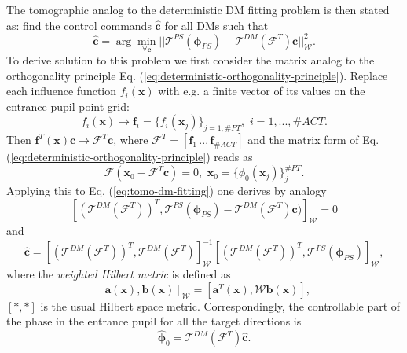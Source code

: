 The tomographic analog to the deterministic DM fitting problem is then stated
as: find the control commands $\hat{\bm{c}}$ for all DMs such that
\begin{equation} \label{eq:tomo-dm-fitting}
	\hat{\bm{c}} = \arg \min_{\forall \bm{c}}
	||
	\mathcal{T}^{PS} (\bm{\phi}_{PS}) -
	\mathcal{T}^{DM} (\mathcal{F}^{T}) \bm{c}
	||^{2}_{\mathcal{W}}.
\end{equation}
To derive solution to this problem we first consider the matrix analog to the
orthogonality principle Eq. (\ref{eq:deterministic-orthogonality-principle}).
Replace each influence function $f_{i}(\bm{x})$ with e.g. a finite vector of
its values on the entrance pupil point grid:
$$ f_{i}(\bm{x}) \rightarrow \bm{f}_{i} = \{ f_{i}(\bm{x}_{j}) \}_{j=1,\#PT},
   \,\, i = 1,...,\#ACT. $$
Then $ \bm{f}^{T}(\bm{x}) \bm{c} \rightarrow \mathcal{F}^{T} \bm{c} $, where
$\mathcal{F}^{T} = [\bm{f}_{1} \,...\, \bm{f}_{\#ACT}]$ and the matrix form
of Eq. (\ref{eq:deterministic-orthogonality-principle}) reads as
\begin{equation} \label{eq:matrix-orthogonality-principle}
	\mathcal{F} (\bm{x}_{0} - \mathcal{F}^{T} \bm{c}) = 0,
	\,\, \bm{x}_{0} = \{ \phi_{0}(\bm{x}_{j}) \}_{j}^{\#PT}.
\end{equation}
Applying this to Eq. (\ref{eq:tomo-dm-fitting}) one derives by analogy
\begin{equation} \label{eq:tomo-dm-fit}
  [ ( \mathcal{T}^{DM} (\mathcal{F}^{T}) )^{T},
	    \mathcal{T}^{PS} (\bm{\phi}_{PS}) -
		  \mathcal{T}^{DM} (\mathcal{F}^{T}) \bm{c} ) ]_{\mathcal{W}} = 0
\end{equation}
and
\begin{equation} \label{eq:tomo-dm-fit}
  \hat{\bm{c}} =
  [ (\mathcal{T}^{DM} (\mathcal{F}^{T}))^{T},
		 \mathcal{T}^{DM} (\mathcal{F}^{T}) ]^{-1}_{\mathcal{W}}
  [ (\mathcal{T}^{DM} (\mathcal{F}^{T}))^{T},
		 \mathcal{T}^{PS} (\bm{\phi}_{PS}) ]_{\mathcal{W}},
\end{equation}
where the \emph{weighted Hilbert metric} is defined as
\begin{equation} \label{eq:weighted-Hilbert-metric}
	[\bm{a}(\bm{x}),\bm{b}(\bm{x})]_{\mathcal{W}} =
	[ \bm{a}^{T}(\bm{x}), \mathcal{W} \bm{b}(\bm{x}) ],
\end{equation}
$[*,*]$ is the usual Hilbert space metric. Correspondingly, the controllable
part of the phase in the entrance pupil for all the target directions is
\begin{equation} \label{eq:tomo-controllable}
	\hat{\bm{\phi}}_{0} = \mathcal{T}^{DM} (\mathcal{F}^{T}) \hat{\bm{c}}.
\end{equation}

